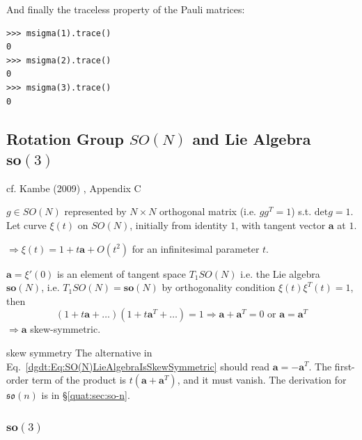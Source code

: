 And finally the traceless property of the Pauli matrices:
\begin{lstlisting}
>>> msigma(1).trace()
0
>>> msigma(2).trace()
0
>>> msigma(3).trace()
0
\end{lstlisting} 

\subsection{Rotation Group $SO(N)$ and Lie Algebra $\textbf{so}(3)$}\label{dgdt:sec:kambe-so3}

cf. Kambe (2009) \cite{dgdt:TKambe2009}, Appendix C

$g \in SO(N)$ represented by $N\times N$ orthogonal matrix (i.e. $gg^T = 1$) s.t. $\text{det}g = 1$. \\

Let curve $\xi(t)$ on $SO(N)$, initially from identity $1$, with tangent vector $\mathbf{a}$ at $1$.

$\Longrightarrow \xi(t) = 1 + t\mathbf{a} + O(t^2)$ for an infinitesimal parameter $t$.

$\mathbf{a} = \xi'(0)$ is an element of tangent space $T_1 SO(N)$ i.e. the Lie algebra $\mathbf{so}(N)$, i.e. $T_1SO(N) = \mathbf{so}(N)$ by orthogonality condition $\xi(t) \xi^T(t) = 1$, then
\begin{equation}\label{dgdt:Eq:SO(N)LieAlgebraIsSkewSymmetric}
(1 + t\mathbf{a} + \dots ) (1 + t\mathbf{a}^T + \dots )  = 1 \Longrightarrow \mathbf{a} + \mathbf{a}^T = 0 \text{ or } \mathbf{a} = \mathbf{a}^T
\end{equation}
$\Longrightarrow  \mathbf{a}$ skew-symmetric.
\begin{correction}{skew symmetry}
The alternative in Eq.~\eqref{dgdt:Eq:SO(N)LieAlgebraIsSkewSymmetric} should read
$\mathbf a=-\mathbf a^T$. The first-order term of the product is
$t(\mathbf a+\mathbf a^T)$, and it must vanish.
The derivation for $\mathfrak{so}(n)$ is in \S\ref{quat:sec:so-n}.
\end{correction}

\subsubsection{$\mathbf{so}(3)$}

